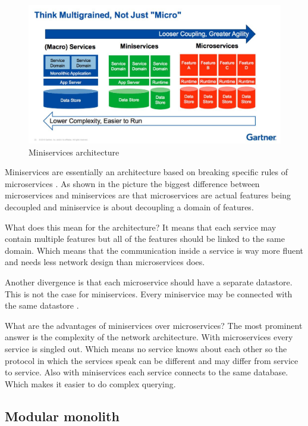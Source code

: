 \begin{figure}[H]
	\includegraphics[width=\linewidth]{miniservices.png}
	\caption{Miniservices architecture \cite{miniservicesDefinition}}
\end{figure}

Miniservices are essentially an architecture based on breaking specific rules of microservices \cite{miniservicesOrigin}. As shown in the picture the biggest difference between microservices and miniservices are that microservices are actual features being decoupled and miniservice is about decoupling a domain of features.

What does this mean for the architecture? It means that each service may contain multiple features but all of the features should be linked to the same domain. Which means that the communication inside a service is way more fluent and needs less network design than microservices does.

Another divergence is that each microservice should have a separate datastore. This is not the case for miniservices. Every miniservice may be connected with the same datastore \cite{miniservicesDefinition}.

What are the advantages of miniservices over microservices? The most prominent answer is the complexity of the network architecture. With microservices every service is singled out. Which means no service knows about each other so the protocol in which the services speak can be different and may differ from service to service. Also with miniservices each service connects to the same database. Which makes it easier to do complex querying.

\subsection{Modular monolith}
\label{sec:ModularMonolith}

